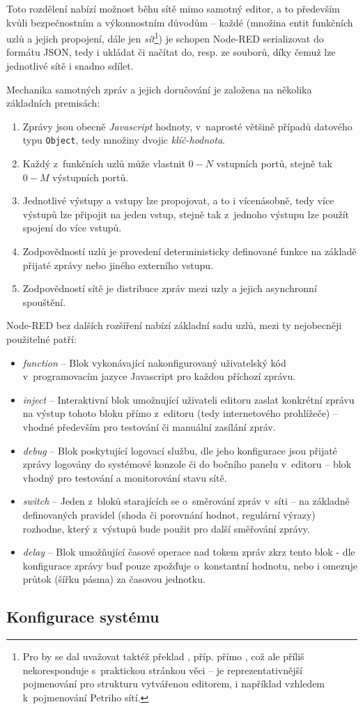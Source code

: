 Toto rozdělení nabízí možnost běhu sítě mimo samotný editor, a to především kvůli bezpečnostním a
výkonnostním důvodům -- každé  (množina entit funkčních uzlů a jejich propojení, dále jen
\emph{sít}\footnote{Pro  by se dal uvažovat taktéž překlad ,
příp. přímo , což ale příliš nekoresponduje s~praktickou stránkou věci --  je reprezentativnější
pojmenování pro strukturu vytvářenou editorem, i například vzhledem k~pojmenování Petriho sítí.}) je schopen
Node-RED serializovat do formátu JSON, tedy i ukládat či načítat do, resp. ze souborů, díky čemuž lze jednotlivé sítě i snadno sdílet.

Mechanika samotných zpráv a jejich doručování je založena na několika základních premisách:
\begin{enumerate}
    \item Zprávy jsou obecně \emph{Javascript} hodnoty, v~naprosté většině případů datového typu \texttt{Object}, tedy množiny dvojic \emph{klíč-hodnota}.
    \item Každý z~funkčních uzlů může vlastnit $0-N$ vstupních portů, stejně tak $0-M$ výstupních portů.
    \item Jednotlivé výstupy a vstupy lze propojovat, a to i vícenásobně, tedy více výstupů lze připojit na jeden vstup,
    stejně tak z~jednoho výstupu lze použít spojení do více vstupů.
    \item Zodpovědností uzlů je provedení deterministicky definované funkce na základě přijaté zprávy nebo
    jiného externího vstupu.
    \item Zodpovědností sítě je distribuce zpráv mezi uzly a jejich asynchronní spouštění.
\end{enumerate}

Node-RED bez dalších rozšíření nabízí základní sadu uzlů, mezi ty nejobecněji použitelné patří:

\begin{itemize}
    \item\emph{function} -- Blok vykonávající nakonfigurovaný uživatelský kód v~programovacím jazyce Javascript pro
    každou příchozí zprávu.
    \item\emph{inject} -- Interaktivní blok umožnující uživateli editoru zaslat konkrétní zprávu na výstup tohoto bloku
    přímo z~editoru (tedy internetového prohlížeče) -- vhodné především pro testování či manuální zasílání zpráv.
    \item\emph{debug} -- Blok poskytující logovací službu, dle jeho konfigurace jsou přijaté zprávy logovány do systémové konzole či do
    bočního panelu v~editoru -- blok vhodný pro testování a monitorování stavu sítě.
    \item\emph{switch} -- Jeden z~bloků starajících se o~směrování zpráv v~síti -- na základně definovaných pravidel
    (shoda či porovnání hodnot, regulární výrazy) rozhodne, který z~výstupů bude použit pro další směřování zprávy.
    \item\emph{delay} -- Blok umožňující časové operace nad tokem zpráv zkrz tento blok - dle konfigurace zprávy buď
    pouze zpožďuje o~konstantní hodnotu, nebo i omezuje průtok (šířku pásma) za časovou jednotku.
\end{itemize}

\subsection{Konfigurace systému}

